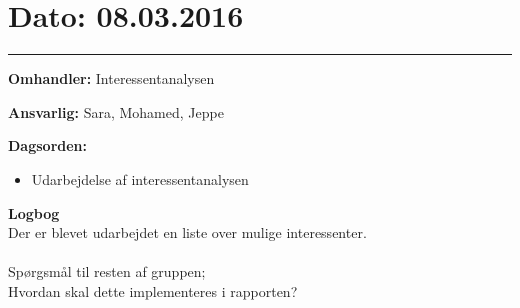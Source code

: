 \section{Dato: 08.03.2016}
\hrule

\textbf{Omhandler:} Interessentanalysen

\textbf{Ansvarlig:} Sara, Mohamed, Jeppe

\textbf{Dagsorden:}
\begin{itemize}
	\item Udarbejdelse af interessentanalysen
\end{itemize}

\textbf{Logbog}
\\
Der er blevet udarbejdet en liste over mulige interessenter. \\
\\
Spørgsmål til resten af gruppen; \\
Hvordan skal dette implementeres i rapporten? 

